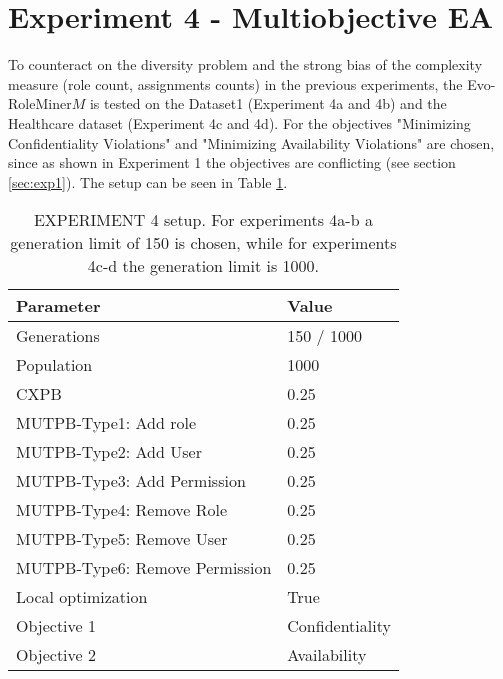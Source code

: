 \newpage
\section{Experiment 4 - Multiobjective EA}
\label{sec:exp4}
To counteract on the diversity problem and the strong bias of the complexity measure (role count, assignments counts) in the previous experiments, the Evo-RoleMiner$M$ is tested on the Dataset1 (Experiment 4a and 4b) and the Healthcare dataset (Experiment 4c and 4d). For the objectives "Minimizing Confidentiality Violations" and "Minimizing Availability Violations" are chosen, since as shown in Experiment 1 the objectives are conflicting (see section \ref{sec:exp1}). The setup can be seen in Table \ref{tab:exp4_setup}.

\begin{table}[H]
	\centering
	\begin{adjustbox}{width=0.5\textwidth}
		\begin{tabular}{|l|l|}
			\hline
			\rowcolor{myGray} 
			\textbf{Parameter}              & \textbf{Value}    \\ \hline
			Generations                     & 150 / 1000       	\\ \hline
			Population                      & 1000        		\\ \hline
			CXPB                            & 0.25              \\ \hline
			MUTPB-Type1: Add role           & 0.25              \\ \hline
			MUTPB-Type2: Add User           & 0.25              \\ \hline
			MUTPB-Type3: Add Permission     & 0.25              \\ \hline
			MUTPB-Type4: Remove Role        & 0.25              \\ \hline
			MUTPB-Type5: Remove User        & 0.25              \\ \hline
			MUTPB-Type6: Remove Permission  & 0.25              \\ \hline
			Local optimization              & True        		\\ \hline
			Objective 1					    & Confidentiality   \\ \hline
			Objective 2					    & Availability     	\\ \hline
		\end{tabular}
	\end{adjustbox}
	\caption{EXPERIMENT 4 setup. For experiments 4a-b a generation limit of 150 is chosen, while for experiments 4c-d the generation limit is 1000.}
	\label{tab:exp4_setup}
\end{table}

